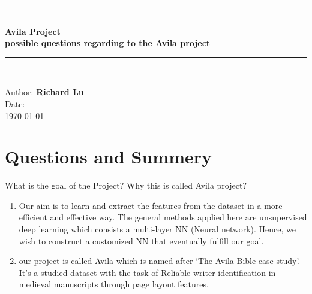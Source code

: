 \documentclass[12pt]{article}
\numberwithin{equation}{section}
\newenvironment{theo}[2][]{\begin{box_for_theo}[#1]{#2}}{\end{box_for_theo}}
\newenvironment{proof}{\begin{box_for_proof}}{\end{box_for_proof}}
\begin{document}
\begin{titlepage}
    \hspace{0pt}
    \vfill
    \begin{tcolorbox}
    \begin{center}
        \rule{\textwidth}{1.5pt}\\[1mm]
        \LARGE{\textbf{Avila Project}}\\[3mm]
        \large{\textbf{possible questions regarding to the Avila project}}\\[1mm]
        \rule{\textwidth}{1.5pt}\\[1mm]
    \end{center}
    \end{tcolorbox}
    \vfill
    \begin{tcolorbox}
        \begin{center}
            \large{Author: \textbf{Richard Lu}}\\
            \large{Date:}\\
            \large{\today}
        \end{center}
    \end{tcolorbox}
\end{titlepage}


\section{Questions and Summery}

\begin{theo}[title=Question 1]{}
	What is the goal of the Project? Why this is called Avila project?
\end{theo}

\vspace{10mm}

\begin{proof}
	\begin{enumerate}
		\item Our aim is to learn and extract the features from the dataset in a more efficient and effective way. The general methods applied here are unsupervised deep learning which consists a multi-layer NN (Neural network). Hence, we wish  to construct a customized NN that eventually fulfill our goal.
		\item our project is called Avila which is named after `The Avila Bible case study'. It's a studied dataset with the task of Reliable writer identification in medieval manuscripts through page layout features.
	\end{enumerate}
	
\end{proof}
\end{document}
